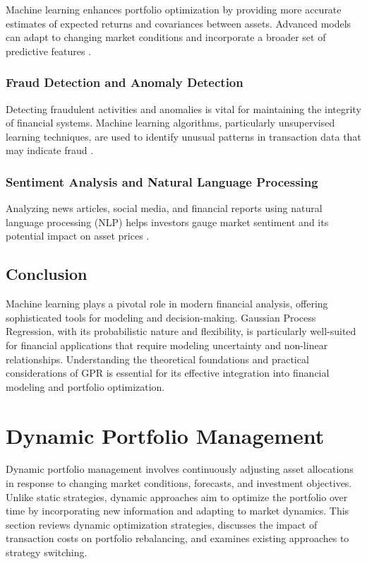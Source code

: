 Machine learning enhances portfolio optimization by providing more accurate estimates of expected returns and covariances between assets. Advanced models can adapt to changing market conditions and incorporate a broader set of predictive features \cite{heaton2017deep}.

\subsubsection{Fraud Detection and Anomaly Detection}

Detecting fraudulent activities and anomalies is vital for maintaining the integrity of financial systems. Machine learning algorithms, particularly unsupervised learning techniques, are used to identify unusual patterns in transaction data that may indicate fraud \cite{phua2010comprehensive}.

\subsubsection{Sentiment Analysis and Natural Language Processing}

Analyzing news articles, social media, and financial reports using natural language processing (NLP) helps investors gauge market sentiment and its potential impact on asset prices \cite{hagenau2013automated, loughran2011liability}.

\subsection{Conclusion}

Machine learning plays a pivotal role in modern financial analysis, offering sophisticated tools for modeling and decision-making. Gaussian Process Regression, with its probabilistic nature and flexibility, is particularly well-suited for financial applications that require modeling uncertainty and non-linear relationships. Understanding the theoretical foundations and practical considerations of GPR is essential for its effective integration into financial modeling and portfolio optimization.


\section{Dynamic Portfolio Management}

Dynamic portfolio management involves continuously adjusting asset allocations in response to changing market conditions, forecasts, and investment objectives. Unlike static strategies, dynamic approaches aim to optimize the portfolio over time by incorporating new information and adapting to market dynamics. This section reviews dynamic optimization strategies, discusses the impact of transaction costs on portfolio rebalancing, and examines existing approaches to strategy switching.

